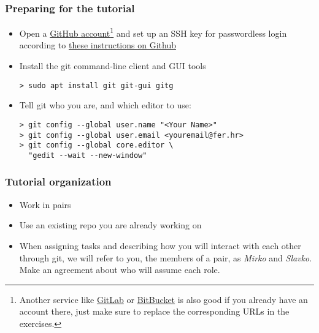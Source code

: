 \begin{frame}[fragile]

\frametitle{Preparing for the tutorial}
	
\begin{itemize}
	\item  Open a \href{https://github.com/join?source=header-home}{GitHub account}\footnote{Another service like \href{https://gitlab.com}{GitLab} or \href{https://bitbucket.org/}{BitBucket} is also good if you already have an account there, just make sure to replace the corresponding URLs in the exercises.} and set up an SSH key for passwordless login according to \href{https://help.github.com/articles/adding-a-new-ssh-key-to-your-github-account/}{these instructions on Github}
	\item Install the git command-line client and GUI tools
	\begin{verbatim}
> sudo apt install git git-gui gitg
	\end{verbatim}
	\item Tell git who you are, and which editor to use:
	\begin{verbatim}
> git config --global user.name "<Your Name>"
> git config --global user.email <youremail@fer.hr>
> git config --global core.editor \
  "gedit --wait --new-window"
	\end{verbatim}
\end{itemize}

\end{frame}


\begin{frame}

\frametitle{Tutorial organization}
	
\begin{itemize}
	\item Work in pairs
	\item Use an existing repo you are already working on
	\item When assigning tasks and describing how you will interact with each other through git, we will refer to you, the members of a pair, as \textit{Mirko} and \textit{Slavko}. Make an agreement about who will assume each role.
\end{itemize}
	
\end{frame}

